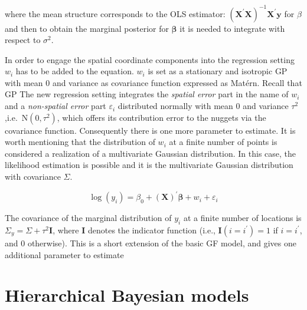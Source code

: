 \documentclass[
  12pt,
  a4paper,
  oneside]{book}
\begin{document}
where the mean structure corresponds to the OLS estimator: \(\left(\boldsymbol{X}^{\prime} \boldsymbol{X}\right)^{-1} \boldsymbol{X}^{\prime} \boldsymbol{y}\) for \(\beta\) and then to obtain the marginal posterior for \(\boldsymbol{\beta}\) it is needed to integrate with respect to \(\sigma^2\).

In order to engage the spatial coordinate components into the regression setting \(w_{i}\) has to be added to the equation. \(w_{i}\) is set as a stationary and isotropic GP with mean 0 and variance as covariance function expressed as Matérn.
Recall that GP
The new regression setting integrates the \emph{spatial error} part in the name of \(w_{i}\) and a \emph{non-spatial error} part \(\varepsilon_{i}\) distributed normally with mean 0 and variance \(\tau^2\) ,i.e.~\(\mathrm{N}\left(0, \tau^{2}\right)\), which offers its contribution error to the nuggets via the covariance function.
Consequently there is one more parameter to estimate. It is worth mentioning that the distribution of \(w_{i}\) at a finite number of points is considered a realization of a multivariate Gaussian distribution. In this case, the likelihood estimation is possible and it is the multivariate Gaussian distribution with covariance \(\Sigma\).

\[
\log(y_{i})= \beta_{0} + (\mathbf{X})^{\prime}\boldsymbol{\beta}+w_{i}+\varepsilon_{i}
\]

The covariance of the marginal distribution of \(y_{i}\) at a finite number of locations is \(\Sigma_{y} = \Sigma + \tau^2\mathbf{I}\), where \(\mathbf{I}\) denotes the indicator function (i.e., \(\mathbf{I}(i = i^{\prime})= 1\) if \(i = i^{\prime}\), and 0 otherwise). This is a short extension of the basic GF model, and gives one additional parameter to estimate

\hypertarget{hiermod}{%
\section{Hierarchical Bayesian models}\label{hiermod}}
\end{document}

